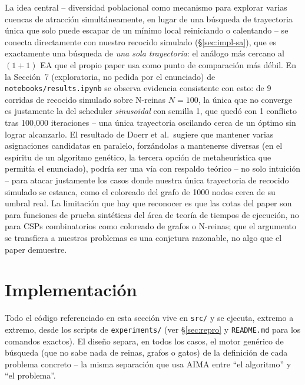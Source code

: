 \documentclass[11pt,onecolumn,letterpaper]{article}
\newcommand{\code}[1]{\texttt{#1}}
\begin{document}
La idea central -- diversidad poblacional como mecanismo para explorar varias cuencas de
atracci\'on simult\'aneamente, en lugar de una b\'usqueda de trayectoria \'unica que solo
puede escapar de un m\'inimo local reiniciando o calentando -- se conecta directamente con
nuestro recocido simulado (\S\ref{sec:impl-sa}), que es exactamente una b\'usqueda de
\emph{una sola trayectoria}: el an\'alogo m\'as cercano al $(1+1)$ EA que el propio paper usa
como punto de comparaci\'on m\'as d\'ebil. En la Secci\'on~7 (exploratoria, no pedida por el
enunciado) de \code{notebooks/results.ipynb} se observa evidencia consistente con esto:
de 9 corridas de recocido simulado sobre N-reinas $N=100$, la \'unica que no converge es
justamente la del scheduler \emph{sinusoidal} con semilla 1, que qued\'o con 1 conflicto
tras 100{,}000 iteraciones -- una \'unica trayectoria oscilando cerca de un \'optimo sin
lograr alcanzarlo. El resultado de Doerr et al.\ sugiere que mantener varias asignaciones
candidatas en paralelo, forz\'andolas a mantenerse diversas (en el esp\'iritu de un
algoritmo gen\'etico, la tercera opci\'on de metaheur\'istica que permit\'ia el enunciado),
podr\'ia ser una v\'ia con respaldo te\'orico -- no solo intuici\'on -- para atacar
justamente los casos donde nuestra \'unica trayectoria de recocido simulado se estanca,
como el coloreado del grafo de 1000 nodos cerca de su umbral real. La limitaci\'on que hay
que reconocer es que las cotas del paper son para funciones de prueba sint\'eticas del
\'area de teor\'ia de tiempos de ejecuci\'on, no para CSPs combinatorios como coloreado de
grafos o N-reinas; que el argumento se transfiera a nuestros problemas es una conjetura
razonable, no algo que el paper demuestre.

\section{Implementaci\'on}

Todo el c\'odigo referenciado en esta secci\'on vive en \code{src/} y se ejecuta,
extremo a extremo, desde los scripts de \code{experiments/} (ver \S\ref{sec:repro} y
\code{README.md} para los comandos exactos). El dise\~no separa, en todos los casos, el
motor gen\'erico de b\'usqueda (que no sabe nada de reinas, grafos o gatos) de la
definici\'on de cada problema concreto -- la misma separaci\'on que usa AIMA entre
``el algoritmo'' y ``el problema''.
\end{document}
